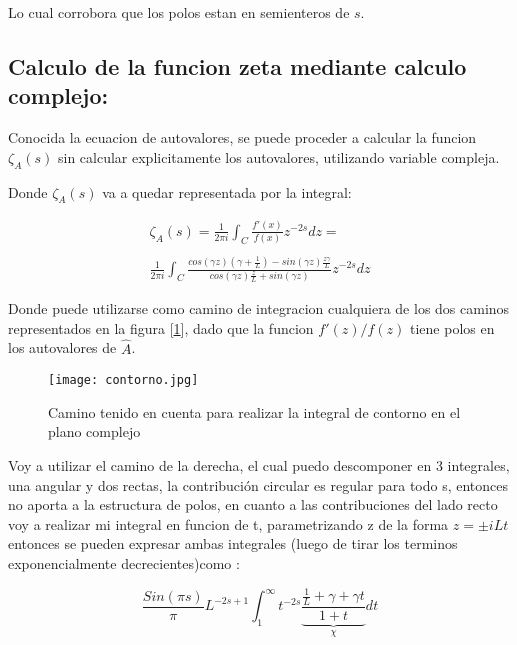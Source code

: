Lo cual corrobora que los polos estan en semienteros de $s$.

\subsection{Calculo de la funcion zeta mediante calculo complejo:}

Conocida la ecuacion de autovalores, se puede proceder a calcular la funcion $\zeta _A (s) $ sin calcular explicitamente los autovalores, utilizando variable compleja.

Donde $\zeta _A (s) $ va a quedar representada por la integral:

\begin{equation}
\begin{array}{c}
   \zeta _A (s) =  \frac{1}{2 \pi i} \int _{C} \frac{f'(x)}{f(x)} z ^{-2s} dz = \\ 
   \\ 
    \frac{1}{2 \pi i} \int _{C}
    \frac{ cos(\gamma z) \left(\gamma + \frac{1}{L} \right) - sin(\gamma z) \frac{z \gamma}{L}
    }
    {cos(\gamma z) \frac{z}{L} + sin(\gamma z)
    }
    z ^{-2 s} dz
\end{array}
\end{equation}

Donde puede utilizarse como camino de integracion cualquiera de los dos caminos representados en la figura [\ref{fig:contorno}], dado que la funcion $f'(z) / f(z) $ tiene polos en los autovalores de $\hat{A}$.






\begin{figure}
\centering
\texttt{[image: contorno.jpg]}
\caption{Camino tenido en cuenta para realizar la integral de contorno en el plano complejo}
\label{fig:contorno}
\end{figure}


Voy a utilizar el camino de la derecha, el cual puedo descomponer en 3 integrales, una angular y dos rectas, la contribución circular es regular para todo s, entonces no aporta a la estructura de polos, en cuanto a las contribuciones del lado recto voy a realizar mi integral en funcion de t, parametrizando z de la forma $z = \pm i L t$ entonces se pueden expresar ambas integrales (luego de tirar los terminos exponencialmente decrecientes)como  :

\begin{equation}
    \frac{Sin(\pi s)}{ \pi } L ^{-2s+1}
    \int _1 ^{\infty} 
    t ^{-2s}
    \underbrace
    {
	\frac{ \frac{1}{L} + \gamma + \gamma t}
	{1+ t}
	} _{\chi}
    dt 
\label{contorno}
\end{equation}

